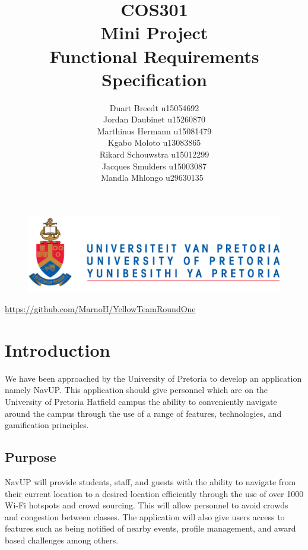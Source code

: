 \documentclass[12pt]{article}
\begin{document}
	

	\begin{figure}
		\includegraphics[width=\linewidth]{logo.jpg}	
	\end{figure}

	\title 	{
				COS301\\
				Mini Project\\
				Functional Requirements Specification
		   	}
	\author {
				Duart Breedt u15054692\\
				Jordan Daubinet u15260870\\
				Marthinus Hermann u15081479\\
				Kgabo Moloto u13083865\\
				Rikard Schouwstra u15012299\\
				Jacques Smulders u15003087\\
				Mandla Mhlongo u29630135\
			}
	\maketitle
	\begin{center}
			\url{https://github.com/MarnoH/YellowTeamRoundOne}	
	\end{center}
	\newpage
	\tableofcontents
	\newpage
	\section{Introduction}
		We have been approached by the University of Pretoria to develop an application namely NavUP. This application should give personnel which are on the University of Pretoria Hatfield campus the ability to conveniently navigate around the campus through the use of a range of features, technologies, and gamification principles.
		
	\subsection{Purpose}
		NavUP will provide students, staff, and guests with the ability to navigate from their current location to a desired location efficiently through the use of over 1000 Wi-Fi hotspots and crowd sourcing. This will allow personnel to avoid crowds and congestion between classes. The application will also give users access to features such as being notified of nearby events, profile management, and award based challenges among others.
\end{document}
